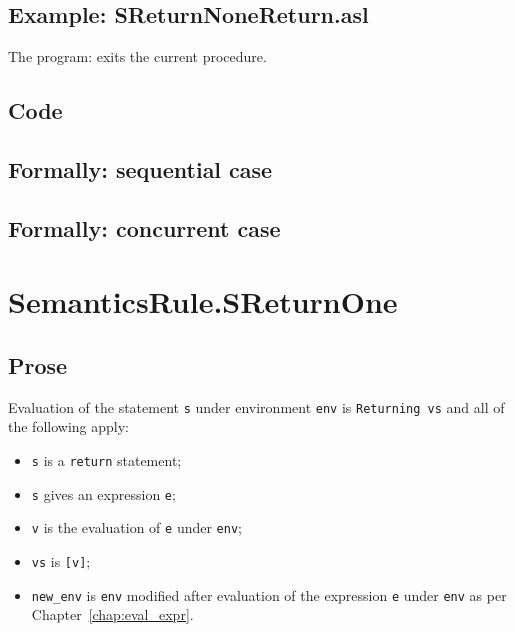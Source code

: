 \documentclass{book}
\begin{document}
    \subsection{Example: SReturnNoneReturn.asl}
    The program:
    exits the current procedure.

  \subsection{Code}

\begin{emptyformal}
  \subsection{Formally: sequential case}

  \subsection{Formally: concurrent case}
\end{emptyformal}


\section{SemanticsRule.SReturnOne \label{sec:SemanticsRule.SReturnOne}}

    \subsection{Prose}
Evaluation of the statement \texttt{s} under environment \texttt{env} is
\texttt{Returning vs} and all of the following apply:
    \begin{itemize}
    \item \texttt{s} is a \texttt{return} statement;
    \item \texttt{s} gives an expression \texttt{e};
    \item \texttt{v} is the evaluation of \texttt{e} under \texttt{env};
    \item \texttt{vs} is \texttt{[v]};
    \item \texttt{new\_env} is \texttt{env} modified after evaluation of the expression \texttt{e} under \texttt{env} as per Chapter~\ref{chap:eval_expr}.
    \end{itemize}
\end{document}
